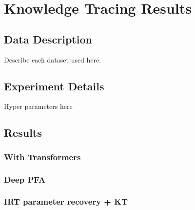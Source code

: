 \chapter{Knowledge Tracing Results}

\section{Data Description}
Describe each dataset used here.

\section{Experiment Details}
Hyper parameters here

\section{Results}

\subsection{With Transformers}

\subsection{Deep PFA}

\subsection{IRT parameter recovery + KT}


